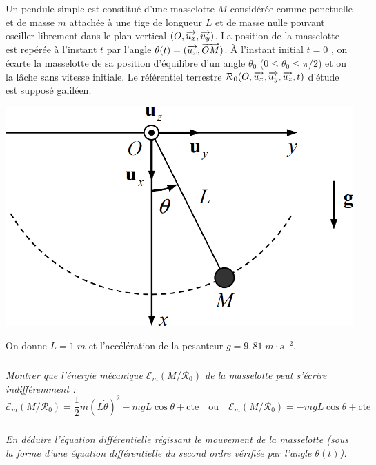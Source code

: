 \documentclass[10pt,oneside]{article}
\begin{document}
\begin{minipage}[c]{.6\linewidth}
Un pendule simple est constitué d’une masselotte $M$ considérée comme ponctuelle et de masse $m$ attachée à une tige de longueur $L$ et de masse nulle pouvant osciller librement dans le plan vertical $(O ,\overrightarrow{u_x} ,\overrightarrow{u_y} )$. La position de la masselotte
est repérée à l’instant $t$ par l’angle $\theta(t) = (\overrightarrow{u_x} , \overrightarrow{OM})$. À l’instant initial $t = 0$ , on écarte la masselotte de sa position d'équilibre d'un angle  $\theta_0$  ($0\leq \theta_0\leq\pi/2$) et on la lâche sans vitesse initiale. Le
référentiel terrestre $\mathcal{R}_0(O,\overrightarrow{u_x},\overrightarrow{u_y},\overrightarrow{u_z},t)$ d’étude est supposé galiléen.
\end{minipage}\hfill
\begin{minipage}[c]{.35\linewidth}
\begin{center}
\includegraphics[width=.95\textwidth]{images/pendule}
\end{center}
\end{minipage}

On donne $L=1\;m$ et l'accélération de la pesanteur $g=9,81\; m\cdot s^{-2}$. 


\subparagraph{\label{q1}}
\textit{Montrer que l’énergie mécanique $\mathcal{E}_m(M/\mathcal{R}_0)$ de la masselotte peut s'écrire indifféremment :}
\begin{equation}
\label{eq1}
\mathcal{E}_m(M/\mathcal{R}_0) = \dfrac{1}{2}m\left( L\dot{\theta} \right)^2 -mgL\cos\theta + \text{cte} \quad \text{ou}\quad \mathcal{E}_m(M/\mathcal{R}_0) = -mgL\cos\theta + \text{cte}
\end{equation}

\subparagraph{}
\textit{En déduire l'équation différentielle régissant le mouvement de la masselotte (sous la forme d’une équation différentielle du second ordre vérifiée par l’angle $\theta(t)$).}
\end{document}
